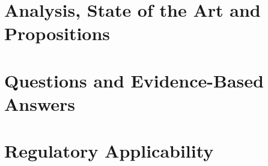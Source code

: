 \documentclass[11pt,a4paper,twoside]{book}
\let\oldsection\section
\begin{document}


\part{Analysis, State of the Art and Propositions}
\label{part:main}

\setcounter{secnumdepth}{3}
\setcounter{section}{0}
\renewcommand{\section}{\clearpage\oldsection}
\glsresetall



\part{Questions and Evidence-Based Answers}
\label{part:argumentation}

\setcounter{section}{0}
\renewcommand{\theHsection}{arg.\arabic{section}}
\glsresetall



\part{Regulatory Applicability}
\label{part:reg-applicability}

\end{document}
